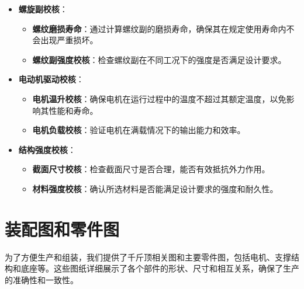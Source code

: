 \documentclass[12pt, a4paper, oneside]{ctexart}
\begin{document}
\begin{itemize}
  \item \textbf{螺旋副校核}：
    \begin{itemize}
    \item \textbf{螺纹磨损寿命}：通过计算螺纹副的磨损寿命，确保其在规定使用寿命内不会出现严重损坏。
    \item \textbf{螺纹副强度校核}：检查螺纹副在不同工况下的强度是否满足设计要求。
    \end{itemize}
  \item \textbf{电动机驱动校核}：
    \begin{itemize}
        \item \textbf{电机温升校核}：确保电机在运行过程中的温度不超过其额定温度，以免影响其性能和寿命。
        \item \textbf{电机负载校核}：验证电机在满载情况下的输出能力和效率。
        \end{itemize}
      \item \textbf{结构强度校核}：
        \begin{itemize}
        \item \textbf{截面尺寸校核}：检查截面尺寸是否合理，能否有效抵抗外力作用。
        \item \textbf{材料强度校核}：确认所选材料是否能满足设计要求的强度和耐久性。
        \end{itemize}
    \end{itemize}
    
    \section{装配图和零件图}
    为了方便生产和组装，我们提供了千斤顶相关图和主要零件图，包括电机、支撑结构和底座等。这些图纸详细展示了各个部件的形状、尺寸和相互关系，确保了生产的准确性和一致性。
    
\end{document}
